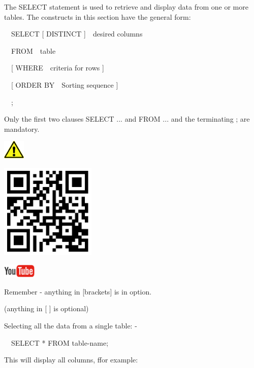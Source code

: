 The SELECT statement is used to retrieve and display data from one or more tables.  The constructs in this section have the general form:

\ \   SELECT [ DISTINCT ]\ \ desired columns

\ \   FROM\ \ table

\ \ [ WHERE\ \ criteria for rows ]

\ \ [ ORDER BY\ \ Sorting sequence ]

\ \   ;

Only the first two clauses SELECT ... and FROM ... and the terminating  ;  are mandatory.



\begin{center}
  
\includegraphics[width=1.048cm,height=0.903cm]{images/img (2).png}

\end{center}
\begin{center}
\begin{minipage}{4.849cm}
   
\includegraphics[width=4.553cm,height=4.553cm]{images/img (14).png}
 

   
\includegraphics[width=1.582cm,height=0.674cm]{images/img (15).png}
 
\end{minipage}
\end{center}
Remember - anything in [brackets] is in option.

 (anything in [ ] is optional)

Selecting all the data from a single table: -

\ \ SELECT  *  FROM  table-name;

This will display all columns, ffor example:

